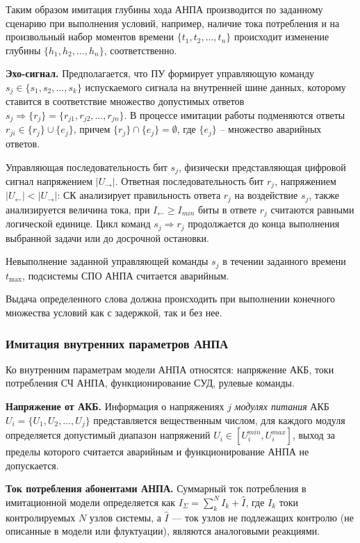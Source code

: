 Таким образом имитация глубины хода АНПА производится по заданному сценарию
при выполнения условий, например, наличие тока потребления
и на произвольный набор моментов времени $\{t_1, t_2, \ldots, t_n\}$
происходит изменение глубины $\{h_1, h_2, \ldots, h_n\}$, соответственно.


\textbf{Эхо-сигнал.}
Предполагается, что ПУ формирует управляющую команду $s_j \in \{s_1, s_2, \ldots, s_k\}$ испускаемого сигнала на внутренней шине данных,
которому ставится в соответствие множество допустимых ответов $s_j \Rightarrow \{r_j\} = \{r_{j1}, r_{j2}, \ldots, r_{jn}\}$.
В процессе имитации работы подменяются ответы
$r_{ji} \in \{r_j\} \cup \{e_j\}$, причем $\{r_j\} \cap \{e_j\} = \emptyset$,
где $\{e_j\}$ -- множество аварийных ответов.


Управляющая последовательность бит $s_j$, физически представляющая цифровой сигнал напряжением $|U_{\longrightarrow}|$.
Ответная последовательность бит $r_j$, напряжением $|U_{\longleftarrow}| < |U_{\longrightarrow}|$:
СК анализирует правильность ответа $r_j$ на воздействие $s_j$,
также анализируется величина тока, при $I_{\longleftarrow} \geq I_{min}$ биты в ответе $r_j$ считаются равными логической единице.
Цикл команд $s_j \Rightarrow r_j$ продолжается до конца выполнения выбранной задачи или до досрочной остановки.

Невыполнение заданной управляющей команды $s_j$ в течении заданного времени $t_{\mbox{max}}$,
подсистемы СПО АНПА считается аварийным.

Выдача определенного слова должна происходить при выполнении конечного множества условий как с задержкой, так и без нее.


\subsubsection{Имитация внутренних параметров АНПА}\label{sec:model_anpa:inner_params}
Ко внутренним параметрам модели АНПА относятся: 
напряжение АКБ,
токи потребления СЧ АНПА,
функционирование СУД,
рулевые команды.


\textbf{Напряжение от АКБ.}
Информация о напряжениях $j$ \textit{модулях питания} АКБ $U_i = \{U_1, U_2, \ldots, U_j\}$ представляется вещественным числом,
для каждого модуля определяется допустимый диапазон напряжений $U_i \in [U_i^{min}, U_i^{max}]$,
выход за пределы которого считается аварийным и функционирование АНПА не допускается.

\textbf{Ток потребления абонентами АНПА.}
Суммарный ток потребления в имитационной модели определяется как $I_\Sigma = \sum_k^N I_k + \hat I$,
где $I_k$ токи контролируемых $N$ узлов системы, а $\hat I$ --- ток узлов не подлежащих контролю (не описанные в модели или флуктуации),
являются аналоговыми реакциями. %

